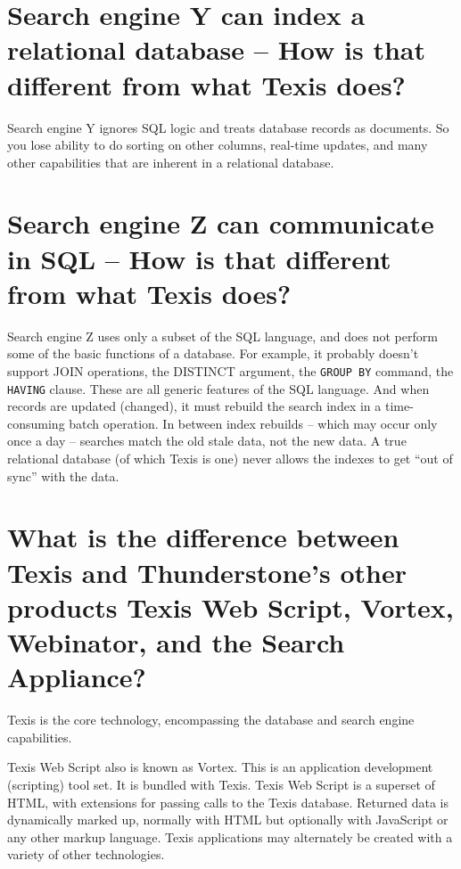 \section{Search engine Y can index a relational database -- How is that different from what Texis does? }

Search engine Y ignores SQL logic and treats database records as
documents. So you lose ability to do sorting on other columns,
real-time updates, and many other capabilities that are inherent in a
relational database.

\section{Search engine Z can communicate in SQL -- How is that different from what Texis does? }

Search engine Z uses only a subset of the SQL language, and does not
perform some of the basic functions of a database.  For example, it
probably doesn't support JOIN operations, the DISTINCT argument, the
{\tt GROUP BY} command, the {\tt HAVING} clause.  These are all
generic features of the SQL language.  And when records are updated
(changed), it must rebuild the search index in a time-consuming batch
operation.  In between index rebuilds -- which may occur only once a
day -- searches match the old stale data, not the new data.  A true
relational database (of which Texis is one) never allows the indexes
to get ``out of sync'' with the data.

\section{What is the difference between Texis and Thunderstone's other products Texis Web Script, Vortex, Webinator, and the Search Appliance? }

Texis is the core technology, encompassing the database and search
engine capabilities.

Texis Web Script also is known as Vortex.  This is an application
development (scripting) tool set.  It is bundled with Texis.  Texis
Web Script is a superset of HTML, with extensions for passing calls to
the Texis database.  Returned data is dynamically marked up, normally
with HTML but optionally with JavaScript or any other markup language.
Texis applications may alternately be created with a variety of other
technologies.

